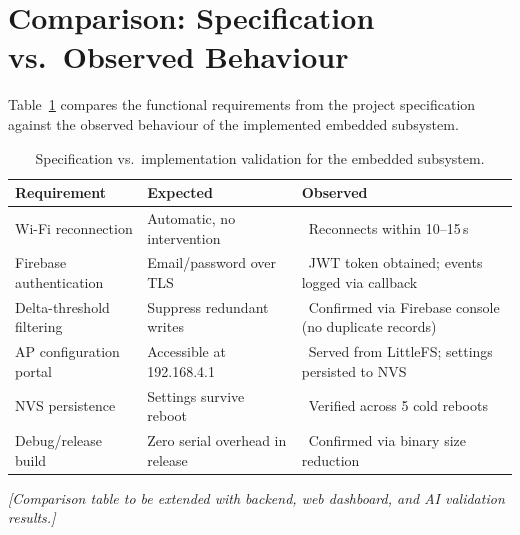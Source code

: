 \section{Comparison: Specification vs.\ Observed Behaviour}

Table~\ref{tab:comparison} compares the functional requirements from the project
specification against the observed behaviour of the implemented embedded subsystem.

\begin{table}[H]
	\centering
	\caption{Specification vs.\ implementation validation for the embedded subsystem.}
	\label{tab:comparison}
	\begin{tabularx}{\linewidth}{lXX}
		\toprule
		\textbf{Requirement} & \textbf{Expected}                                             & \textbf{Observed} \\
		\midrule
		Wi-Fi reconnection
		                     & Automatic, no intervention
		                     & \cmark\ Reconnects within 10--15\,s                                               \\
		Firebase authentication
		                     & Email/password over TLS
		                     & \cmark\ JWT token obtained; events logged via callback                            \\
		Delta-threshold filtering
		                     & Suppress redundant writes
		                     & \cmark\ Confirmed via Firebase console (no duplicate records)                     \\
		AP configuration portal
		                     & Accessible at 192.168.4.1
		                     & \cmark\ Served from LittleFS; settings persisted to NVS                           \\
		NVS persistence
		                     & Settings survive reboot
		                     & \cmark\ Verified across 5 cold reboots                                            \\
		Debug/release build
		                     & Zero serial overhead in release
		                     & \cmark\ Confirmed via binary size reduction                                       \\
		\bottomrule
	\end{tabularx}
\end{table}

\begin{center}
	\textit{[Comparison table to be extended with backend, web dashboard, and AI
				validation results.]}
\end{center}

